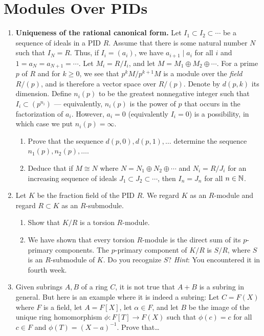 \documentclass[../psets.tex]{subfiles}
\begin{document}
\section{Modules Over PIDs}
\begin{enumerate}
    \item {}\textbf{Uniqueness of the rational canonical form.} Let $I_1\subset I_2\subset\cdots$ be a sequence of ideals in a PID $R$. Assume that there is some natural number $N$ such that $I_N=R$. Thus, if $I_i=(a_i)$, we have $a_{i+1}\mid a_i$ for all $i$ and $1=a_N=a_{N+1}=\cdots$. Let $M_i=R/I_i$, and let $M=M_1\oplus M_2\oplus\cdots$. For a prime $p$ of $R$ and for $k\geq 0$, we see that $p^kM/p^{k+1}M$ is a module over the \emph{field} $R/(p)$, and is therefore a vector space over $R/(p)$. Denote by $d(p,k)$ its dimension. Define $n_i(p)$ to be the greatest nonnegative integer such that $I_i\subset(p^{n_i})$ --- equivalently, $n_i(p)$ is the power of $p$ that occurs in the factorization of $a_i$. However, $a_i=0$ (equivalently $I_i=0$) is a possibility, in which case we put $n_i(p)=\infty$.
    \begin{enumerate}
        \item Prove that the sequence $d(p,0),d(p,1),\dots$ determine the sequence $n_1(p),n_2(p),\dots$.
        \item Deduce that if $M\cong N$ where $N=N_1\oplus N_2\oplus\cdots$ and $N_i=R/J_i$ for an increasing sequence of ideals $J_1\subset J_2\subset\cdots$, then $I_n=J_n$ for all $n\in\mathbb{N}$.
    \end{enumerate}
    \item Let $K$ be the fraction field of the PID $R$. We regard $K$ as an $R$-module and regard $R\subset K$ as an $R$-submodule.
    \begin{enumerate}
        \item Show that $K/R$ is a torsion $R$-module.
        \item We have shown that every torsion $R$-module is the direct sum of its $p$-primary components. The $p$-primary component of $K/R$ is $S/R$, where $S$ is an $R$-submodule of $K$. Do you recognize $S$? \emph{Hint}: You encountered it in fourth week.
    \end{enumerate}
    \item Given subrings $A,B$ of a ring $C$, it is not true that $A+B$ is a subring in general. But here is an example where it is indeed a subring: Let $C=F(X)$ where $F$ is a field, let $A=F[X]$, let $\alpha\in F$, and let $B$ be the image of the unique ring homomorphism $\phi:F[T]\to F(X)$ such that $\phi(c)=c$ for all $c\in F$ and $\phi(T)=(X-a)^{-1}$. Prove that\dots

\end{enumerate}
\end{document}
